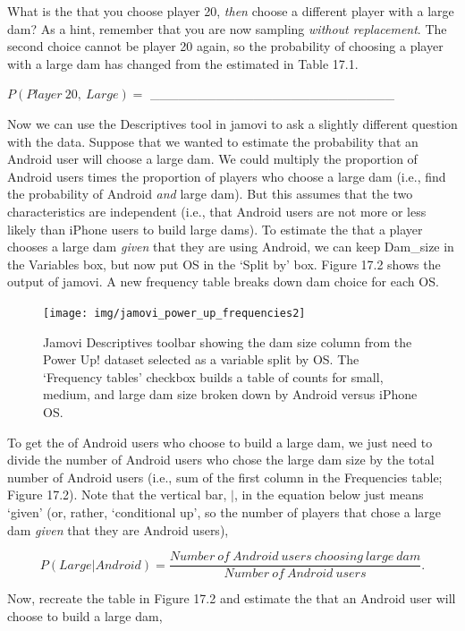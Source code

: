 \documentclass[
  openany]{krantz}
\begin{document}
What is the  that you choose player 20, \emph{then} choose a different player with a large dam?
As a hint, remember that you are now sampling \emph{without replacement}.
The second choice cannot be player 20 again, so the probability of choosing a player with a large dam has changed from the estimated  in Table 17.1.

\(P(Player\:20,\:Large) =\) \_\_\_\_\_\_\_\_\_\_\_\_\_\_\_\_\_\_\_\_\_\_\_\_\_\_

Now we can use the Descriptives tool in jamovi to ask a slightly different question with the data.
Suppose that we wanted to estimate the probability that an Android user will choose a large dam.
We could multiply the proportion of Android users times the proportion of players who choose a large dam (i.e., find the probability of Android \emph{and} large dam).
But this assumes that the two characteristics are independent (i.e., that Android users are not more or less likely than iPhone users to build large dams).
To estimate the  that a player chooses a large dam \emph{given} that they are using Android, we can keep Dam\_size in the Variables box, but now put OS in the `Split by' box.
Figure 17.2 shows the output of jamovi.
A new frequency table breaks down dam choice for each OS.

\begin{figure}
\texttt{[image: img/jamovi\_power\_up\_frequencies2]} \caption{Jamovi Descriptives toolbar showing the dam size column from the Power Up! dataset selected as a variable split by OS. The `Frequency tables' checkbox builds a table of counts for small, medium, and large dam size broken down by Android versus iPhone OS.}\label{fig:unnamed-chunk-67}
\end{figure}

To get the  of Android users who choose to build a large dam, we just need to divide the number of Android users who chose the large dam size by the total number of Android users (i.e., sum of the first column in the Frequencies table; Figure 17.2).
Note that the vertical bar, \(|\), in the equation below just means `given' (or, rather, `conditional up', so the number of players that chose a large dam \emph{given} that they are Android users),

\[P(Large | Android) = \frac{Number\:of\:Android\:users\:choosing\:large\:dam}{Number\:of\:Android\:users}.\]

Now, recreate the table in Figure 17.2 and estimate the  that an Android user will choose to build a large dam,
\end{document}
